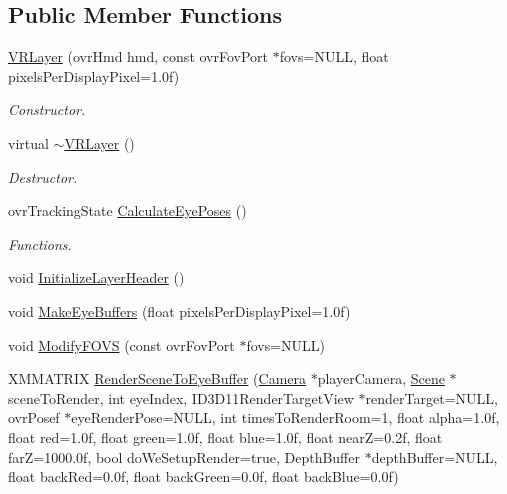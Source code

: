 \subsection*{Public Member Functions}
\begin{DoxyCompactItemize}
\item 
\hyperlink{class_v_r_layer_a16cea0d400080518b73a30c2ac38d2d6}{V\+R\+Layer} (ovr\+Hmd hmd, const ovr\+Fov\+Port $\ast$fovs=N\+U\+LL, float pixels\+Per\+Display\+Pixel=1.\+0f)
\begin{DoxyCompactList}\small\item\em Constructor. \end{DoxyCompactList}\item 
virtual \hyperlink{class_v_r_layer_a673f6e38b025c92bb4397d223b1b30fa}{$\sim$\+V\+R\+Layer} ()
\begin{DoxyCompactList}\small\item\em Destructor. \end{DoxyCompactList}\item 
ovr\+Tracking\+State \hyperlink{class_v_r_layer_ab942320f67671f92e2e0c15c6a68ee78}{Calculate\+Eye\+Poses} ()
\begin{DoxyCompactList}\small\item\em Functions. \end{DoxyCompactList}\item 
void \hyperlink{class_v_r_layer_adc020df4324c1a9fd3eb4b87ea7b2b16}{Initialize\+Layer\+Header} ()
\item 
void \hyperlink{class_v_r_layer_a37225d61e04354b44647bf7e895da76b}{Make\+Eye\+Buffers} (float pixels\+Per\+Display\+Pixel=1.\+0f)
\item 
void \hyperlink{class_v_r_layer_a8941a91820ed1e6cac2a3fc3bbb9529d}{Modify\+F\+O\+VS} (const ovr\+Fov\+Port $\ast$fovs=N\+U\+LL)
\item 
X\+M\+M\+A\+T\+R\+IX \hyperlink{class_v_r_layer_a3e9bfdfff5a069783b084e0a12b1d292}{Render\+Scene\+To\+Eye\+Buffer} (\hyperlink{class_camera}{Camera} $\ast$player\+Camera, \hyperlink{class_scene}{Scene} $\ast$scene\+To\+Render, int eye\+Index, I\+D3\+D11\+Render\+Target\+View $\ast$render\+Target=N\+U\+LL, ovr\+Posef $\ast$eye\+Render\+Pose=N\+U\+LL, int times\+To\+Render\+Room=1, float alpha=1.\+0f, float red=1.\+0f, float green=1.\+0f, float blue=1.\+0f, float near\+Z=0.\+2f, float far\+Z=1000.\+0f, bool do\+We\+Setup\+Render=true, Depth\+Buffer $\ast$depth\+Buffer=\+N\+U\+L\+L, float back\+Red=0.\+0f, float back\+Green=0.\+0f, float back\+Blue=0.\+0f)
\item 

\end{DoxyCompactItemize}
